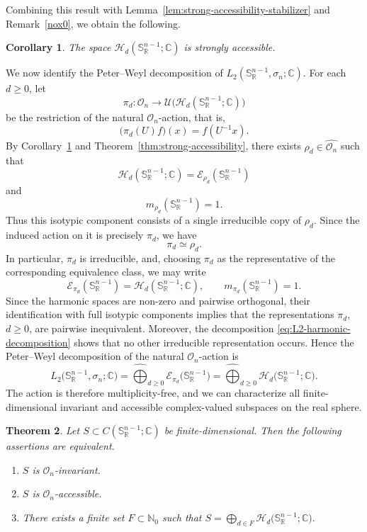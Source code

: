 \documentclass[11pt,showkeys]{amsart}
\newtheorem{theorem}{Theorem}[section]
\newtheorem{corollary}[theorem]{Corollary}
\begin{document}
Combining this result  with Lemma~\ref{lem:strong-accessibility-stabilizer}
and Remark~\ref{nox0}, we obtain the following.

\begin{corollary}
\label{cor:real-harmonics-strong-accessibility}
The space
$\mathcal H_d(\mathbb S_{\mathbb R}^{n-1};\mathbb C)$ is strongly accessible.
\end{corollary}


We now identify the Peter--Weyl decomposition of
\(L_2(\mathbb S_{\mathbb R}^{n-1},\sigma_n;\mathbb C)\). For each
\(d\geq 0\), let
\[
    \pi_d:\mathcal O_n
    \longrightarrow
    \mathcal U\bigl(
        \mathcal H_d(\mathbb S_{\mathbb R}^{n-1};\mathbb C)
    \bigr)
\]
be the restriction of the natural \(\mathcal O_n\)-action, that is,
\[
    \bigl(\pi_d(U)f\bigr)(x)
    =
    f(U^{-1}x).
\]
By Corollary~\ref{cor:real-harmonics-strong-accessibility} and
Theorem~\ref{thm:strong-accessibility}, there exists
\(\rho_d\in\widehat{\mathcal O_n}\) such that
\[
    \mathcal H_d(\mathbb S_{\mathbb R}^{n-1};\mathbb C)
    =
    \mathcal E_{\rho_d}(\mathbb S_{\mathbb R}^{n-1})
\]
and
\[
    m_{\rho_d}(\mathbb S_{\mathbb R}^{n-1})=1.
\]
Thus this isotypic component consists of a single irreducible copy of
\(\rho_d\). Since the induced action on it is precisely \(\pi_d\), we
have
\[
    \pi_d\simeq\rho_d.
\]
In particular, \(\pi_d\) is irreducible, and, choosing \(\pi_d\) as the
representative of the corresponding equivalence class, we may write
\[
    \mathcal E_{\pi_d}(\mathbb S_{\mathbb R}^{n-1})
    =
    \mathcal H_d(\mathbb S_{\mathbb R}^{n-1};\mathbb C),
    \qquad
    m_{\pi_d}(\mathbb S_{\mathbb R}^{n-1})=1.
\]
Since the harmonic spaces are non-zero and pairwise orthogonal, their
identification with full isotypic components implies that the
representations \(\pi_d\), \(d\geq0\), are pairwise inequivalent.
Moreover, the decomposition
\eqref{eq:L2-harmonic-decomposition} shows that no other irreducible
representation occurs. Hence the Peter--Weyl decomposition of the
natural \(\mathcal O_n\)-action is
\[
L_2\bigl(\mathbb S_{\mathbb R}^{n-1},\sigma_n;\mathbb C\bigr)
=
\widehat{\bigoplus}_{d\geq0}
\mathcal E_{\pi_d}\bigl(\mathbb S_{\mathbb R}^{n-1}\bigr)
=
\widehat{\bigoplus}_{d\geq0}
\mathcal H_d\bigl(\mathbb S_{\mathbb R}^{n-1};\mathbb C\bigr).
\]
The action is therefore multiplicity-free, and we can characterize all
finite-dimensional invariant and accessible complex-valued subspaces on
the real sphere.


\begin{theorem}
\label{thm:real-sphere-accessibility}
Let
$S\subset C(\mathbb S_{\mathbb R}^{n-1};\mathbb C)$ be finite-dimensional.
Then the following assertions are equivalent.
\begin{enumerate}
\item $S$ is $\mathcal O_n$-invariant.
\item $S$ is $\mathcal O_n$-accessible.
\item There exists a finite set $F\subset\mathbb N_0$ such that
\(
S
=
\bigoplus_{d\in F}
\mathcal H_d\bigl(\mathbb S_{\mathbb R}^{n-1};\mathbb C\bigr).
\)
\end{enumerate}
\end{theorem}
\end{document}
